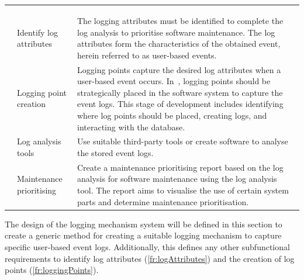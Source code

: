 \setcounter{phase}{0}
\begin{xltabular}{\textwidth}{llX}
	\caption[Functional requirements of the solution]{\textit{Functional requirements of the solution}}\label{tbl:ch2_developmenetRequirements} \\ 
	\toprule
	 &  &  \\
	\midrule
	\endfirsthead

	\caption[]{\continueCaption} \\
	\toprule
	 &  &  \\
	\midrule
	\endhead

	\midrule
	 \\ 
	\endfoot
	\endlastfoot

	 & Identify log attributes & \RaggedRight The logging attributes must be identified to complete the log analysis to prioritise software maintenance. The log attributes form the characteristics of the obtained event, herein referred to as user-based events. \\

	 & Logging point creation & \RaggedRight Logging points capture the desired log attributes when a user-based event occurs. In~, logging points should be strategically placed in the software system to capture the event logs. This stage of development includes identifying where log points should be placed, creating logs, and interacting with the database. \\

	 & \RaggedRight Log analysis tools & Use suitable third-party tools or create software to analyse the stored event logs. \\

	 & \RaggedRight Maintenance prioritising & Create a maintenance prioritising report based on the log analysis for software maintenance using the log analysis tool. The report aims to visualise the use of certain system parts and determine maintenance prioritisation. \\
	\bottomrule
\end{xltabular}

The design of the logging mechanism system will be defined in this section to create a generic method for creating a suitable logging mechanism to capture specific user-based event logs. Additionally, this defines any other subfunctional requirements to identify log attributes (\ref{fr:logAttributes}) and the creation of log points (\ref{fr:loggingPoints}).

